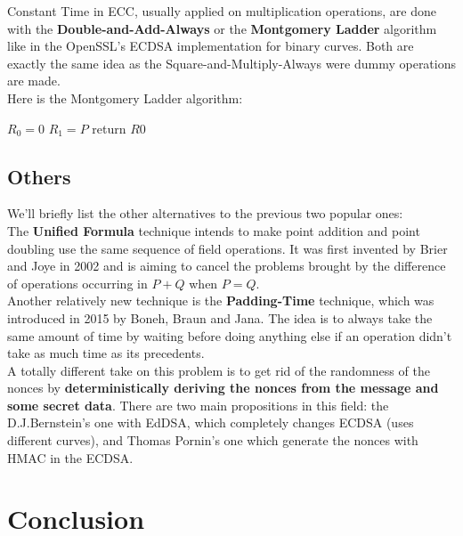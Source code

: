 \documentclass[a4paper,11pt]{article}
\begin{document}
Constant Time in ECC, usually applied on multiplication operations, are done with the \textbf{Double-and-Add-Always} or the \textbf{Montgomery Ladder} algorithm like in the OpenSSL's ECDSA implementation for binary curves. Both are exactly the same idea as the Square-and-Multiply-Always were dummy operations are made.\\
Here is the Montgomery Ladder algorithm:

\begin{algorithm}[H]
    $R_0 = 0$\;
    $R_1 = P$\;
    return $R0$\;
\end{algorithm}

\subsection{Others}

We'll briefly list the other alternatives to the previous two popular ones:\\

The \textbf{Unified Formula} technique intends to make point addition and point doubling use the same sequence of field operations. It was first invented by Brier and Joye in 2002\cite{unified} and is aiming to cancel the problems brought by the difference of operations occurring in $P + Q$ when $P = Q$.\\

Another relatively new technique is the \textbf{Padding-Time} technique, which was introduced in 2015 by Boneh, Braun and Jana. The idea is to always take the same amount of time by waiting before doing anything else if an operation didn't take as much time as its precedents.\\

A totally different take on this problem is to get rid of the randomness of the nonces by \textbf{deterministically deriving the nonces from the message and some secret data}. There are two main propositions in this field: the D.J.Bernstein's one with EdDSA\cite{eddsa}, which completely changes ECDSA (uses different curves), and Thomas Pornin's\cite{pornin} one which generate the nonces with HMAC in the ECDSA.

\section{Conclusion}
\end{document}
